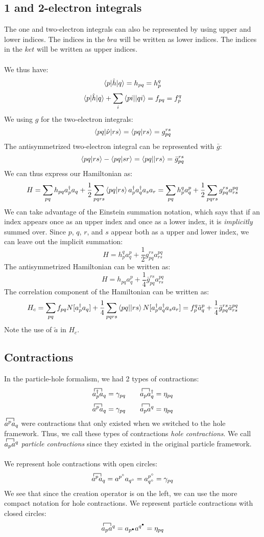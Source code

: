 \documentclass{article}
\newcommand{\fctr}{\contraction}
\newcommand{\dg}{\ensuremath{^\dagger} }
\newcommand{\apd}{\ensuremath{a_p^\dagger} }
\begin{document}
\subsection{1 and 2-electron integrals}
The one and two-electron integrals can also be represented by using upper and lower indices.
The indices in the $bra$ will be written as lower indices. 
The indices in the $ket$ will be written as upper indices. 
\\ \\
We thus have: 
\[\braket{p | \hat{h}| q} = h_{pq} = h_p^q \]
\[\braket{p | \hat{h}| q} + \sum_i \braket{pi || qi} = f_{pq} = f_p^q \]
We using $g$ for the two-electron integrals:
\[\braket{pq| \hat{\nu} | rs} = \braket{pq| rs} =g_{pq}^{rs} \]
The antisymmetrized two-electron integral can be represented with $\bar{g}$: 
\[\braket{pq| rs}  - \braket{pq| sr} = \braket{pq|| rs} =\bar{g}_{pq}^{rs} \]
We can thus express our Hamiltonian as: 
\[ H = \sum_{pq} h_{pq} \apd a_q + \frac{1}{2} \sum_{pqrs} \braket{pq|rs} \apd a_q\dg a_s a_r  = \sum_{pq} h_{p}^{q} a_q^p + \frac{1}{2} \sum_{pqrs} g_{pq}^{rs} a^{pq}_{rs}  \] 
We can take advantage of the Einstein summation notation, which says that if an index appears once as an upper index and once as a lower index, it is \textit{implicitly} summed over. 
Since $p$, $q$, $r$, and $s$ appear both as a upper and lower index, we can leave out the implicit summation: 
\[ H  =  h_{p}^{q} a_q^p +  \frac{1}{2} g_{pq}^{rs} a^{pq}_{rs} \]
The antisymmetrized Hamiltonian can be written as: 
\[ H  = h_{pq} a_q^p +  \frac{1}{4} \bar{g}_{pq}^{rs} a^{pq}_{rs} \]
The correlation component of the Hamiltonian can be written as: 
\[ H_c  = \sum_{pq}f_{pq} N[\apd a_q  ] +  \frac{1}{4}\sum_{pqrs}  \braket{pq||rs}  N[\apd a_q\dg a_s a_r] =   f_{p}^{q} \tilde{a}_q^p +  \frac{1}{4} \bar{g}_{pq}^{rs} \tilde{a}^{pq}_{rs} \]
Note the use of $\tilde{a}$ in $H_c$. 
\subsection{Contractions} 
In the particle-hole formalism, we had 2 types of contractions: 
\[\fctr{ }{a}{{}_p\dg}{a} a_p\dg a_q = \gamma_{pq} \quad \quad \fctr{ }{a}{{}_p}{a} a_p a_q\dg = \eta_{pq} \]
\[\fctr{ }{a}{{}^p}{a} a^p a_q = \gamma_{pq} \quad \quad \fctr{ }{a}{{}_p}{a} a_p a^q = \eta_{pq} \]
$\fctr{ }{a}{{}^p}{a} a^p a_q$ were contractions that only existed when we switched to the hole framework. 
Thus, we call these types of contractions \textit{hole contractions}. 
We call $\fctr{ }{a}{{}_p}{a} a_p a^q $ \textit{particle contractions} since they existed in the original particle framework.  \\ \\
We represent hole contractions with open circles: 
\[ \fctr{ }{a}{{}^p}{a}a^p a_q  = a^{p^\circ} a_{q^\circ} = a^{p^\circ}_{q^\circ} = \gamma_{pq} \]
We see that since the creation operator is on the left, we can use the more compact notation for hole contractions. 
We represent particle contractions with closed circles: 
\[ \fctr{ }{a}{{}_p}{a} a_p a^q  = a_{p^\bullet} a^{q^\bullet}  =  \eta_{pq} \]
\end{document}
